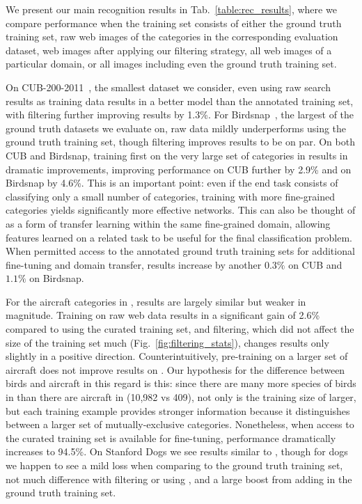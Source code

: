 \documentclass[runningheads]{llncs}
\begin{document}
We present our main recognition results in Tab.~\ref{table:rec_results}, where we compare performance when the training set consists of either the ground truth training set, raw web images of the categories in the corresponding evaluation dataset, web images after applying our filtering strategy, all web images of a particular domain, or all images including even the ground truth training set.

On CUB-200-2011~\cite{wahcub2002011}, the smallest dataset we consider, even using raw search results as training data results in a better model than the annotated training set, with filtering further improving results by 1.3\%.
For Birdsnap~\cite{bergbirdsnapcvpr2014}, the largest of the ground truth datasets we evaluate on, raw data mildly underperforms using the ground truth training set, though filtering improves results to be on par.
On both CUB and Birdsnap, training first on the very large set of categories in \lbird{} results in dramatic improvements, improving performance on CUB further by 2.9\% and on Birdsnap by 4.6\%.
This is an important point: even if the end task consists of classifying only a small number of categories, training with more fine-grained categories yields significantly more effective networks.
This can also be thought of as a form of transfer learning within the same fine-grained domain, allowing features learned on a related task to be useful for the final classification problem.
When permitted access to the annotated ground truth training sets for additional fine-tuning and domain transfer, results increase by another $0.3\%$ on CUB and $1.1\%$ on Birdsnap.

For the aircraft categories in \fgvc{}, results are largely similar but weaker in magnitude.
Training on raw web data results in a significant gain of 2.6\% compared to using the curated training set, and filtering, which did not affect the size of the training set much (Fig.~\ref{fig:filtering_stats}), changes results only slightly in a positive direction.
Counterintuitively, pre-training on a larger set of aircraft does not improve results on \fgvc{}.
Our hypothesis for the difference between birds and aircraft in this regard is this: since there are many more species of birds in \lbird{} than there are aircraft in \lair{} (10,982 vs 409), not only is the training size of \lbird{} larger, but each training example provides stronger information because it distinguishes between a larger set of mutually-exclusive categories.
Nonetheless, when access to the curated training set is available for fine-tuning, performance dramatically increases to 94.5\%.
On Stanford Dogs we see results similar to \fgvc{}, though for dogs we happen to see a mild loss when comparing to the ground truth training set, not much difference with filtering or using \ldog{}, and a large boost from adding in the ground truth training set.
\end{document}
